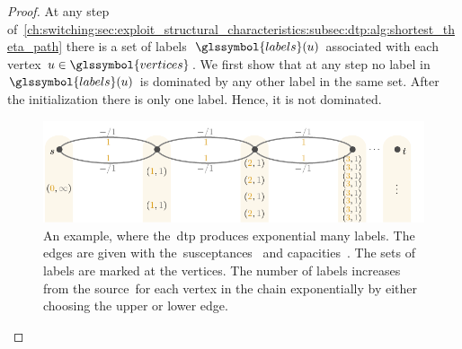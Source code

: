 \begin{proof}
    At any step of~\cref{ch:switching:sec:exploit_structural_characteristics:subsec:dtp:alg:shortest_theta_path} there is a set of
    labels~$\glssymbol{labels}(\vertexa)$ associated with each vertex
    $\vertexa\in\glssymbol{vertices}$. We first show that at any step no label
    in~$\glssymbol{labels}(\vertexa)$ is dominated by any other label in the same
    set.
    After the initialization there is only one label. Hence, it is not
    dominated. 
    \begin{figure}
    \includegraphics[page=1]{switchplacement/figures/DTP_non_poly_num_labels.pdf}
    \caption[An example, where the~\gls{dtp} produces exponential many labels.]
    {%
    An example, where the~\gls{dtp} produces exponential many labels. The edges
    are given with
    the~\textcolor{SUSCEPTANCE}{susceptances~} and
    \textcolor{CAPACITY}{capacities~}. The sets of labels
    are marked at the vertices. The number of labels increases from the
    source~\source for each vertex in the chain exponentially by either choosing
    the upper or lower edge.
    }%
    \label{ch:switching:sec:exploit_structural_characteristics:subsec:dtp:fig:non_poly_number_of_labels}
    \end{figure}
     

\end{proof}
